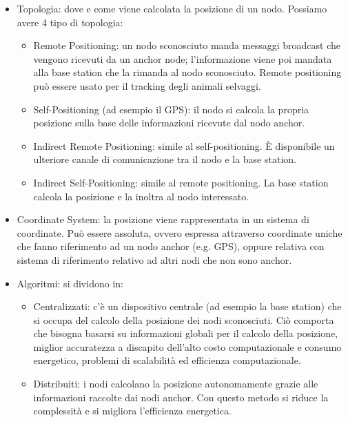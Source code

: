         \begin{itemize}
                \item Topologia: dove e come viene calcolata la posizione di un
nodo. Possiamo avere 4 tipo di topologia:
                        \begin{itemize}
                                \item Remote Positioning: un nodo sconosciuto
manda messaggi broadcast che vengono ricevuti da un anchor node; l'informazione
viene poi mandata alla base station che la rimanda al nodo sconosciuto. Remote
positioning può essere usato per il tracking degli animali selvaggi.
                                \item Self-Positioning (ad esempio il GPS): il
nodo si calcola la propria posizione sulla base delle informazioni ricevute dal
nodo anchor.
                                \item Indirect Remote Positioning: simile al
self-positioning. È disponibile un ulteriore canale di comunicazione tra il nodo
e la base station.
                                \item Indirect Self-Positioning: simile al
remote positioning. La base station calcola la posizione e la inoltra al nodo
interessato.
                        \end{itemize}
                \item Coordinate System: la posizione viene rappresentata in un
sistema di coordinate. Può essere assoluta, ovvero espressa attraverso
coordinate uniche che fanno riferimento ad un nodo anchor (e.g. GPS), oppure
relativa con sistema di riferimento relativo ad altri nodi che non sono anchor.
                \item Algoritmi: si dividono in:
                \begin{itemize}
                        \item Centralizzati: c'è un dispositivo centrale (ad
esempio la base station) che si occupa del calcolo della posizione dei nodi
sconosciuti. Ciò comporta che bisogna basarsi su informazioni globali per il
calcolo della posizione, miglior accuratezza a discapito dell'alto costo
computazionale e consumo energetico, problemi di scalabilità ed efficienza
computazionale.
                        \item Distribuiti: i nodi calcolano la posizione
autonomamente grazie alle informazioni raccolte dai nodi anchor. Con questo
metodo si riduce la complessità e si migliora l'efficienza energetica.


\end{itemize}
\end{itemize}
